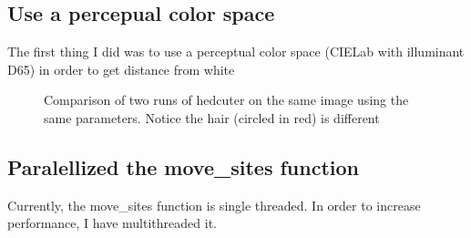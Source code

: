\documentclass[11pt]{article}
\begin{document}
\subsection{Use a percepual color space}
The first thing I did was to use a perceptual color space (CIELab with
illuminant D65) in order to get distance from white

\begin{figure}[H]
  \centering
  \begin{minipage}{.5\textwidth}
    \centering
    
  \end{minipage}%
  \begin{minipage}{.5\textwidth}
    \centering
    
  \end{minipage}
  \caption{Comparison of two runs of hedcuter on the same image using
    the same parameters. Notice the hair (circled in red) is different}
\end{figure}


\subsection{Paralellized the move\_sites function}
Currently, the move\_sites function is single threaded. In order to
increase performance, I have multithreaded it.



\end{document}
